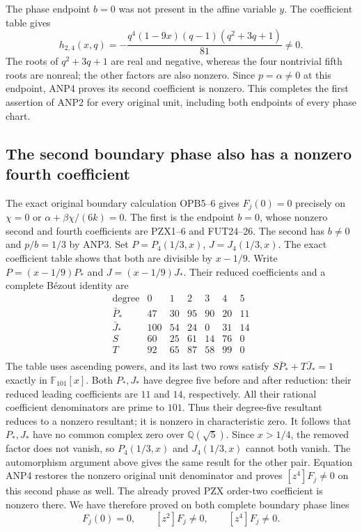 The phase endpoint $b=0$ was not present in the affine variable $y$.
The coefficient table gives
\[
 h_{2,4}(x,q)=
       -\frac{q^4(1-9x)(q-1)(q^2+3q+1)}{81}\ne0.
 \tag{ANP14}
\]
The roots of $q^2+3q+1$ are real and negative, whereas the four
nontrivial fifth roots are nonreal; the other factors are also nonzero.
Since $p=\alpha\ne0$ at this endpoint, ANP4 proves its second
coefficient is nonzero. This completes the first assertion of ANP2
for every original unit, including both endpoints of every phase chart.

\subsection{The second boundary phase also has a nonzero fourth coefficient}
The exact original boundary calculation OPB5--6 gives
$F_j(0)=0$ precisely on $\chi=0$ or $\alpha+\beta\chi/(6k)=0$.
The first is the endpoint $b=0$, whose nonzero second and fourth
coefficients are PZX1--6 and FUT24--26.
The second has $b\ne0$ and $p/b=1/3$ by ANP3.
Set $P=P_4(1/3,x)$, $J=J_4(1/3,x)$.
The exact coefficient table shows that both are divisible by
$x-1/9$. Write $P=(x-1/9)P_*$ and $J=(x-1/9)J_*$.
Their reduced coefficients and a complete B\'ezout identity are
\[
\begin{array}{c|rrrrrr}
\text{degree}&0&1&2&3&4&5\\\hline
\bar P_*&47&30&95&90&20&11\\
\bar J_*&100&54&24&0&31&14\\
S&60&25&61&14&76&0\\
T&92&65&87&58&99&0\\
\end{array}\tag{ANP18}
\]
The table uses ascending powers, and its last two rows satisfy
$S\bar P_*+T\bar J_*=1$ exactly in $\mathbb F_{101}[x]$.
Both $P_*,J_*$ have degree five before and after reduction: their
reduced leading coefficients are $11$ and $14$, respectively.
All their rational coefficient denominators are prime to $101$.
Thus their degree-five resultant reduces to a nonzero resultant;
it is nonzero in characteristic zero. It follows that
$P_*,J_*$ have no common complex zero over $\mathbb Q(\sqrt5)$.
Since $x>1/4$, the removed factor does not vanish, so
$P_4(1/3,x)$ and $J_4(1/3,x)$ cannot both vanish.
The automorphism argument above gives the same result for the other
pair. Equation ANP4 restores the nonzero original unit denominator
and proves $[z^4]F_j\ne0$ on this second phase as well.
The already proved PZX order-two coefficient is nonzero there.
We have therefore proved on both complete boundary phase lines
\[
          F_j(0)=0,\qquad [z^2]F_j\ne0,
                     \qquad [z^4]F_j\ne0.
 \tag{ANP15}
\]

